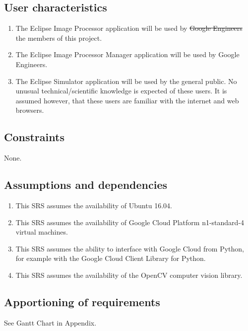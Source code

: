 \documentclass[10pt, onecolumn, draftclsnofoot, letterpaper, compsoc]{IEEEtran}
\begin{document}
\subsection{User characteristics}
	\begin{enumerate}
		\item The Eclipse Image Processor application will be used by
			\sout{Google Engineers} the members of this project.

		\item The Eclipse Image Processor Manager application will be used by
			Google Engineers.

		\item The Eclipse Simulator application will be used by the
			general public. No unusual technical/scientific knowledge is
			expected of these users. It is assumed however, that these users
			are familiar with the internet and web browsers.
	\end{enumerate}

\subsection{Constraints}
None.

\subsection{Assumptions and dependencies}
	\begin{enumerate}
		\item This SRS assumes the availability of Ubuntu 16.04.

		\item This SRS assumes the availability of Google Cloud Platform
		n1-standard-4 virtual machines.

		\item This SRS assumes the ability to interface with Google Cloud from
		Python, for example with the Google Cloud Client Library for Python.

		\item This SRS assumes the availability of the OpenCV computer
		vision library.
	\end{enumerate}

\subsection{Apportioning of requirements}
See Gantt Chart in Appendix.

\newpage
\end{document}
